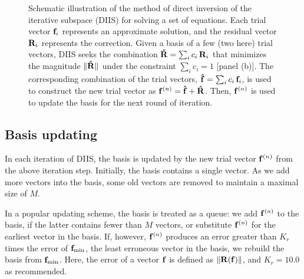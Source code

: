 \documentclass[reprint,superscriptaddress]{revtex4-1}
\begin{document}
\begin{figure}
  \caption{\label{fig:scheme}
    Schematic illustration of the method of
    direct inversion of the iterative subspace (DIIS)
    for solving a set of equations.
    Each trial vector $\mathbf{f}_i$
    represents an approximate solution,
    and the residual vector $\mathbf{R}_i$
    represents the correction.
    Given a basis of a few (two here) trial vectors,
    DIIS seeks the combination
    $\mathbf{\hat R} = \sum_i c_i \, \mathbf{R}_i$
    that minimizes the magnitude
    $\| \mathbf{\hat R} \|$
    under the constraint
    $\sum_i c_i = 1$ [panel (b)].
    The corresponding combination
    of the trial vectors,
    $\mathbf{\hat f} = \sum_i c_i \, \mathbf{f}_i$,
    is used to construct
    the new trial vector as
    $\mathbf{f}^{(n)} = \mathbf{\hat f} + \mathbf{\hat R}$.
    Then, $\mathbf{f}^{(n)}$ is used to
    update the basis
    for the next round of iteration.
  }
\end{figure}




\subsection{Basis updating}



In each iteration of DIIS,
the basis is updated
by the new trial vector $\mathbf{f}^{(n)}$
from the above iteration step.
%
Initially,
the basis contains a single vector.
%
As we add more vectors into the basis,
some old vectors are removed
to maintain a maximal size of $M$.



In a popular updating scheme\cite{kovalenko1999},
the basis is treated as a queue:
%
we add $\mathbf{f}^{(n)}$ to the basis,
if the latter contains fewer than $M$ vectors,
%
or substitute $\mathbf{f}^{(n)}$ for the earliest vector in the basis.
%
If, however, $\mathbf{f}^{(n)}$
produces an error greater than
$K_r$ times the error of
$\mathbf{f}_\mathrm{min}$,
the least erroneous vector in the basis,
%
we rebuild the basis
from $\mathbf{f}_\mathrm{min}$.
%
Here, the error of a vector $\mathbf{f}$ is defined as
$\| \mathbf{R}(\mathbf{f}) \|$,
and
$K_r = 10.0$ as recommended\cite{
kovalenko1999}.
\end{document}

